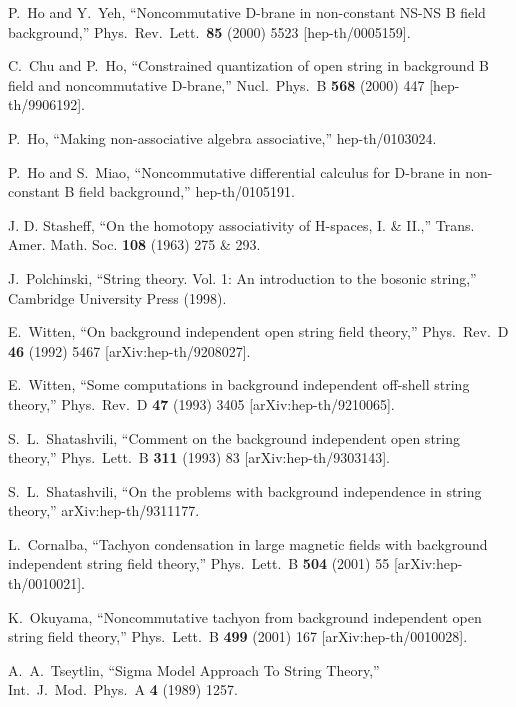 \documentclass[a4paper,11pt]{article}               \def\new#1\endnew{{\bf #1}}
\begin{document}
P.~Ho and Y.~Yeh,
``Noncommutative D-brane in non-constant NS-NS B field background,''
Phys.\ Rev.\ Lett.\  {\bf 85} (2000) 5523
[hep-th/0005159].

C.~Chu and P.~Ho,
``Constrained quantization of open string in background B field and  
noncommutative D-brane,''
Nucl.\ Phys.\ B {\bf 568} (2000) 447
[hep-th/9906192].

P.~Ho,
``Making non-associative algebra associative,''
hep-th/0103024.

P.~Ho and S.~Miao,
``Noncommutative differential calculus for D-brane in non-constant B  
field background,''
hep-th/0105191.

J. D. Stasheff, 
``On the homotopy associativity of H-spaces, I. \& II.,'' 
Trans. Amer. Math. Soc. {\bf 108} (1963) 275 \& 293.

J.~Polchinski,
``String theory. Vol. 1: An introduction to the bosonic string,''
Cambridge University Press (1998).

E.~Witten,
``On background independent open string field theory,''
Phys.\ Rev.\ D {\bf 46} (1992) 5467
[arXiv:hep-th/9208027].

E.~Witten,
``Some computations in background independent off-shell string theory,''
Phys.\ Rev.\ D {\bf 47} (1993) 3405
[arXiv:hep-th/9210065].

S.~L.~Shatashvili,
``Comment on the background independent open string theory,''
Phys.\ Lett.\ B {\bf 311} (1993) 83
[arXiv:hep-th/9303143].

S.~L.~Shatashvili,
``On the problems with background independence in string theory,''
arXiv:hep-th/9311177.

L.~Cornalba,
``Tachyon condensation in large magnetic fields with background  
independent string field theory,''
Phys.\ Lett.\ B {\bf 504} (2001) 55
[arXiv:hep-th/0010021].

K.~Okuyama,
``Noncommutative tachyon from background independent open string field 
theory,''
Phys.\ Lett.\ B {\bf 499} (2001) 167
[arXiv:hep-th/0010028].

A.~A.~Tseytlin,
``Sigma Model Approach To String Theory,''
Int.\ J.\ Mod.\ Phys.\ A {\bf 4} (1989) 1257.
\end{document}
